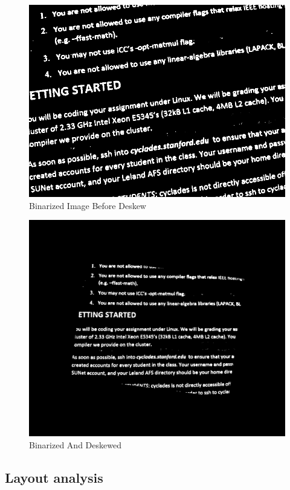 \documentclass[conference]{IEEEtran}
\begin{document}
\begin{figure}
\center
\includegraphics[scale=0.15]{binarized.jpg}
\caption{Binarized Image Before Deskew}
\label{binarized}
\end{figure}

\begin{figure}
\center
\includegraphics[scale=0.15]{deskewedImage.jpg}
\caption{Binarized And Deskewed}
\label{deskewed}
\end{figure}


\subsection{Layout analysis}
\end{document}
